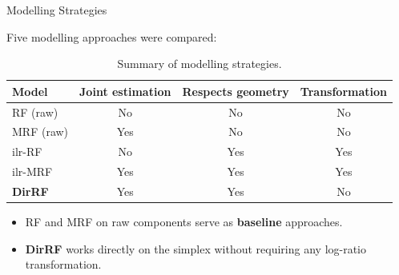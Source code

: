 \begin{frame}{Modelling Strategies}

Five modelling approaches were compared:

\begin{table}
\centering\small
\begin{tabular}{lccc}
  \toprule
  Model & Joint estimation & Respects geometry & Transformation \\
  \midrule
  RF (raw)       & No  & No  & No  \\
  MRF (raw)      & Yes & No  & No  \\
  ilr-RF         & No  & Yes & Yes \\
  ilr-MRF        & Yes & Yes & Yes \\
  \textbf{DirRF} & Yes & Yes & No  \\
  \bottomrule
\end{tabular}
\caption{Summary of modelling strategies.}
\end{table}

\begin{itemize}
  \item RF and MRF on raw components serve as \textbf{baseline} approaches.
  \item \textbf{DirRF} works directly on the simplex without requiring any log-ratio transformation.
\end{itemize}

\end{frame}



